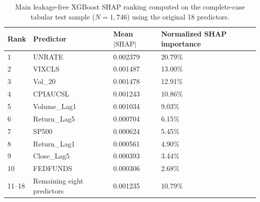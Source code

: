\begin{table}[h]
	\caption{Main leakage-free XGBoost SHAP ranking computed on the complete-case tabular test sample (\(N=1{,}746\)) using the original 18 predictors.}
	\label{tab:main_xgb_shap}
	\setlength{\tabcolsep}{4pt}
	\centering
	\begin{tabular}{p{35pt}p{125pt}p{95pt}p{105pt}}
		\hline
		\textbf{Rank} & \textbf{Predictor} & \textbf{Mean \(|\mathrm{SHAP}|\)} & \textbf{Normalized SHAP importance} \\
		\hline
		1 & UNRATE & 0.002379 & 20.79\% \\
		2 & VIXCLS & 0.001487 & 13.00\% \\
		3 & Vol\_20 & 0.001478 & 12.91\% \\
		4 & CPIAUCSL & 0.001243 & 10.86\% \\
		5 & Volume\_Lag1 & 0.001034 & 9.03\% \\
		6 & Return\_Lag5 & 0.000704 & 6.15\% \\
		7 & SP500 & 0.000624 & 5.45\% \\
		8 & Return\_Lag1 & 0.000561 & 4.90\% \\
		9 & Close\_Lag5 & 0.000393 & 3.44\% \\
		10 & FEDFUNDS & 0.000306 & 2.68\% \\
		11--18 & Remaining eight predictors & 0.001235 & 10.79\% \\
		\hline
	\end{tabular}
	\footnotesize
\end{table}
